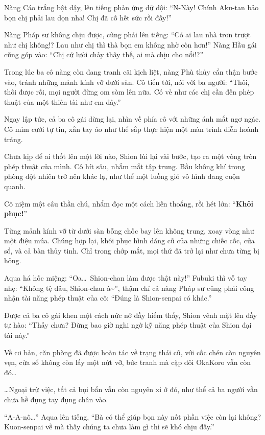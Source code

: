 \documentclass[../main.tex]{subfiles}
\begin{document}
Nàng Cáo trắng bật dậy, lên tiếng phản ứng dữ dội: ``N-Này! Chính Aku-tan bảo bọn chị phải lau dọn nha! Chị đã cố hết sức rồi đấy!''

Nàng Pháp sư không chịu được, cũng phải lên tiếng: ``Có ai lau nhà trơn trượt như chị không!? Lau như chị thì thà bọn em không nhờ còn hơn!'' Nàng Hầu gái cũng góp vào: ``Chị cứ lười chảy thây thế, ai mà chịu cho nổi!?''

Trong lúc ba cô nàng còn đang tranh cãi kịch liệt, nàng Phù thủy cẩn thận bước vào, tránh những mảnh kính vỡ dưới sàn. Cô tiến tới, nói với ba người: ``Thôi, thôi được rồi, mọi người đừng om sòm lên nữa. Có vẻ như các chị cần đến phép thuật của một thiên tài như em đây.''

Ngay lập tức, cả ba cô gái dừng lại, nhìn về phía cô với những ánh mắt ngơ ngác. Cô mỉm cười tự tin, xắn tay áo như thể sắp thực hiện một màn trình diễn hoành tráng.

Chưa kịp để ai thốt lên một lời nào, Shion lùi lại vài bước, tạo ra một vòng tròn phép thuật của mình. Cô hít sâu, nhắm mắt tập trung. Bầu không khí trong phòng đột nhiên trở nên khác lạ, như thể một luồng gió vô hình đang cuộn quanh.

Cô niệm một câu thần chú, nhẩm đọc một cách liến thoắng, rồi hét lớn: ``\textbf{Khôi phục!}''

Từng mảnh kính vỡ từ dưới sàn bỗng chốc bay lên không trung, xoay vòng như một điệu múa. Chúng hợp lại, khôi phục hình dáng cũ của những chiếc cốc, cửa sổ, và cả bàn thủy tinh. Chỉ trong chớp mắt, mọi thứ đã trở lại như chưa từng bị hỏng.

Aqua há hốc miệng: ``Oa\dots\ Shion-chan làm được thật này!'' Fubuki thì vỗ tay nhẹ: ``Không tệ đâu, Shion-chan à\~{}'', thậm chí cả nàng Pháp sư cũng phải công nhận tài năng phép thuật của cô: ``Đúng là Shion-senpai có khác.''

Được cả ba cô gái khen một cách nức nở đầy hiếm thấy, Shion vênh mặt lên đầy tự hào: ``Thấy chưa? Đừng bao giờ nghi ngờ kỹ năng phép thuật của Shion đại tài này.''

Về cơ bản, căn phòng đã được hoàn tác về trạng thái cũ, với cốc chén còn nguyên vẹn, cửa sổ không còn lấy một nứt vỡ, bức tranh mà cặp đôi OkaKoro vẫn còn đó\dots

\dots Ngoại trừ việc, tất cả bụi bẩn vẫn còn nguyên xi ở đó, như thể cả ba người vẫn chưa hề đụng tay đụng chân vào.

``A-A-nô\dots'' Aqua lên tiếng, ``Bà có thể giúp bọn này nốt phần việc còn lại không? Kuon-senpai về mà thấy chúng ta chưa làm gì thì sẽ khó chịu đấy.''
\end{document}
